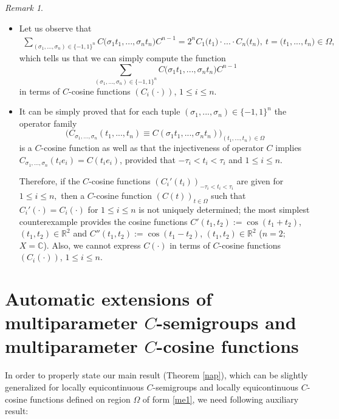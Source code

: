 \documentclass{amsart}
\theoremstyle{definition}
\theoremstyle{remark}
\newtheorem{rem}[thm]{Remark}
\numberwithin{equation}{section}
\begin{document}
\begin{rem}\label{nis}
\begin{itemize}
\item[(i)] Let us observe that
\begin{align*}
\sum_{(\sigma_{1},...,\sigma_{n}) \in \{ -1,1\}^{n}}C\bigl( \sigma_{1}t_{1},..., \sigma_{n}t_{n}\bigr)C^{n-1}=2^{n}C_{1}\bigl(t_{1}\bigr)\cdot ... \cdot C_{n}\bigl(t_{n}\bigr),\  t=\bigl(t_{1},... , t_{n}\bigr) \in \Omega ,
\end{align*} 
which tells us that we can simply compute the function
$$ 
\sum_{(\sigma_{1},...,\sigma_{n}) \in \{ -1,1\}^{n}}C\bigl( \sigma_{1}t_{1},..., \sigma_{n}t_{n}\bigr)C^{n-1}
$$ 
in terms of $C$-cosine functions $(C_{i} (\cdot  ))$, $1\leq i\leq n$. 
\item[(ii)] It can be simply proved that for each tuple $(\sigma_{1},...,\sigma_{n}) \in \{ -1,1\}^{n}$ the operator family 
$$
\bigl(C_{\sigma_{1},...,\sigma_{n}}(t_{1},...,t_{n})\equiv C( \sigma_{1}t_{1},..., \sigma_{n}t_{n})\bigr)_{(t_{1},...,t_{n})\in \Omega}
$$
is a $C$-cosine function as well as that the injectiveness of operator $C$ implies $C_{\sigma_{1},...,\sigma_{n}}(t_{i}e_{i})=C(t_{i}e_{i})$, provided that $-\tau_{i}<t_{i}<\tau_{i}$ and $1\leq i\leq n.$ 

Therefore, if  the $C$-cosine functions $(C_{i}'(t_{i}))_{-\tau_{i}<t_{i}<\tau_{i}}$ are given for $1\leq i\leq n,$ then a $C$-cosine function $(C(t))_{t\in \Omega}$ such that $C_{i}'(\cdot)=C_{i}(\cdot )$ for $1\leq i\leq n$ is not uniquely determined; the most simplest counterexample provides the cosine functions $C'(t_{1},t_{2}):=\cos(t_{1}+t_{2})$, $(t_{1},t_{2})\in {\mathbb R}^{2}$ and $C''(t_{1},t_{2}):=\cos(t_{1}-t_{2})$, $(t_{1},t_{2})\in {\mathbb R}^{2}$ ($n=2;$ $X={\mathbb C}$).
Also, we cannot express $C(\cdot)$ in terms of $C$-cosine functions $(C_{i}(\cdot))$, $1\leq i\leq n$.
\end{itemize}
\end{rem}

\section{Automatic extensions of multiparameter $C$-semigroups and multiparameter $C$-cosine functions}\label{subc}

In order to properly state our main result (Theorem \ref{nap}), which can be slightly generalized for locally equicontinuous $C$-semigroups and locally equicontinuous $C$-cosine functions defined on region $\Omega$ of form \eqref{me1}, we need following auxiliary result:
\end{document}
